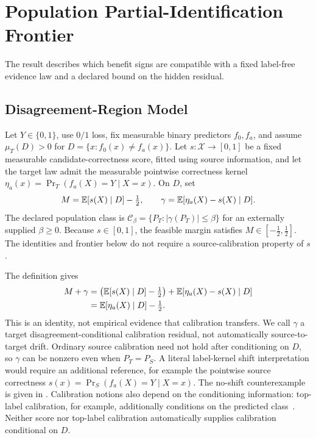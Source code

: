 \section{Population Partial-Identification Frontier}
\label{sec:compact-theory}

The result describes which benefit signs are compatible with a fixed label-free evidence law
and a declared bound on the hidden residual.

\subsection{Disagreement-Region Model}

\begin{assumption}
\label{ass:deploy}
Let $Y\in\{0,1\}$, use $0/1$ loss, fix measurable binary predictors $f_0,f_a$, and assume
$\mu_T(D)>0$ for $D=\{x:f_0(x)\ne f_a(x)\}$. Let
$s:\mathcal X\to[0,1]$ be a fixed measurable candidate-correctness score, fitted using source
information, and let the target law admit the measurable pointwise correctness kernel
$\eta_a(x)=\Pr_T(f_a(X)=Y\mid X=x)$. On $D$, set
\begin{equation}
 M=\mathbb{E}[s(X)\mid D]-\tfrac12,
 \qquad
 \gamma=\mathbb{E}[\eta_a(X)-s(X)\mid D].
 \label{eq:compact-Mgamma}
\end{equation}
The declared population class is
$\mathcal C_\beta=\{P_T:|\gamma(P_T)|\le\beta\}$ for an externally supplied
$\beta\ge0$.
Because $s\in[0,1]$, the feasible margin satisfies $M\in[-\tfrac12,\tfrac12]$.
The identities and frontier below do not require a source-calibration property of $s$.
\end{assumption}

\begin{remark}
\label{rem:gamma-residual}
The definition gives
\begin{align*}
M+\gamma
&=\bigl(\mathbb{E}[s(X)\mid D]-\tfrac12\bigr)
  +\mathbb{E}[\eta_a(X)-s(X)\mid D]\\
&=\mathbb{E}[\eta_a(X)\mid D]-\tfrac12.
\end{align*}
This is an identity, not empirical evidence that calibration transfers. We call $\gamma$ a
target disagreement-conditional calibration residual, not automatically source-to-target
drift. Ordinary source calibration need not hold after conditioning on $D$, so $\gamma$ can be
nonzero even when $P_T=P_S$. A literal label-kernel shift interpretation would require an
additional reference, for example the pointwise source correctness
$s(x)=\Pr_S(f_a(X)=Y\mid X=x)$. The no-shift counterexample is given in
.
Calibration notions also depend on the conditioning information: top-label calibration, for
example, additionally conditions on the predicted class~\cite{gupta2021toplabel}.
Neither score nor top-label calibration automatically supplies calibration conditional on $D$.
\end{remark}

